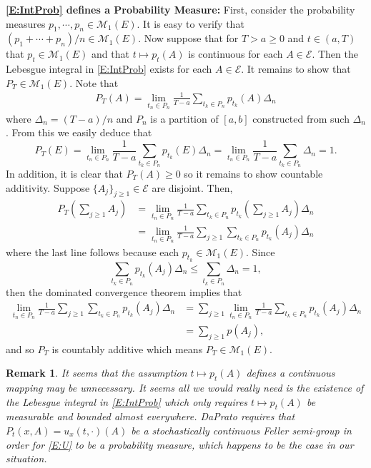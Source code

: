 \documentclass{article}
\newtheorem{remark}{Remark}[section]
\numberwithin{equation}{section}
\begin{document}
\noindent \textbf{\eqref{E:IntProb} defines a Probability Measure:} First, consider the probability measures $p_1,\cdots, p_n \in \mathcal{M}_1(E)$. It is easy to verify that $(p_1 + \cdots + p_n)/n \in \mathcal{M}_1(E)$. Now suppose that for $T > a \ge 0$ and $t \in (a,T)$ that $p_t \in \mathcal{M}_1(E)$ and that $t \mapsto p_t(A)$ is continuous for each $A \in \mathscr{E}$. Then the Lebesgue integral in \eqref{E:IntProb} exists for each $A \in \mathscr{E}$. It remains to show that $P_T \in \mathcal{M}_1(E)$. Note that
	\begin{align*}
		P_T(A) = \lim_{t_n \in P_n} \frac{1}{T-a}\sum_{t_k \in P_n} p_{t_k}(A) \Delta_n
	\end{align*}
where $\Delta_n = (T-a)/n$ and $P_n$ is a partition of $[a,b]$ constructed from such $\Delta_n$. From this we easily deduce that
	\[
		P_T(E) = \lim_{t_n \in P_n} \frac{1}{T-a}\sum_{t_k \in P_n} p_{t_k}(E) \Delta_n = \lim_{t_n \in P_n} \frac{1}{T-a}\sum_{t_k \in P_n} \Delta_n = 1.
	\]
In addition, it is clear that $P_T(A) \ge 0$ so it remains to show countable additivity. Suppose $\{A_j\}_{j \ge 1} \in \mathscr{E}$ are disjoint. Then,
	\begin{align*}
		P_T\left(\sum_{j \ge 1} A_j \right) &= \lim_{t_n \in P_n} \frac{1}{T-a}\sum_{t_k \in P_n} p_{t_k}\left(\sum_{j \ge 1} A_j \right) \Delta_n \\
		&= \lim_{t_n \in P_n} \frac{1}{T-a} \sum_{j \ge 1} \sum_{t_k \in P_n} p_{t_k}\left( A_j \right) \Delta_n
	\end{align*}
where the last line follows because each $p_{t_k} \in \mathcal{M}_1(E)$. Since
	\[
		\sum_{t_k \in P_n} p_{t_k}\left( A_j \right) \Delta_n \le \sum_{t_k \in P_n}  \Delta_n = 1,
	\]
then the dominated convergence theorem implies that
	\begin{align*}
		\lim_{t_n \in P_n} \frac{1}{T-a} \sum_{j \ge 1} \sum_{t_k \in P_n} p_{t_k}\left( A_j \right) \Delta_n &=  \sum_{j \ge 1} \lim_{t_n \in P_n} \frac{1}{T-a} \sum_{t_k \in P_n} p_{t_k}\left( A_j \right) \Delta_n \\
		&=  \sum_{j \ge 1} p(A_j),
	\end{align*}
and so $P_T$ is countably additive which means $P_T \in \mathcal{M}_1(E)$.

\begin{remark}
	\normalfont
	It seems that the assumption $t \mapsto p_t(A)$ defines a continuous mapping may be unnecessary. It seems all we would really need is the existence of the Lebesgue integral in \eqref{E:IntProb} which only requires $t \mapsto p_t(A)$ be measurable and bounded almost everywhere. DaPrato \cite{DZ96} requires that $P_t(x,A) = u_x(t,\cdot)(A)$ be a stochastically continuous Feller semi-group in order for \eqref{E:U} to be a probability measure, which happens to be the case in our situation.
\end{remark}
\end{document}
